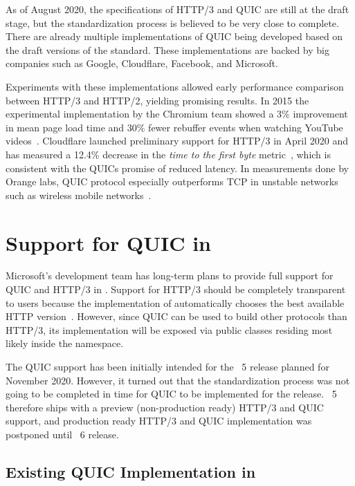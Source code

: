 As of August 2020, the specifications of HTTP/3 and QUIC are still at the draft stage, but the
standardization process is believed to be very close to complete. There are already multiple
implementations of QUIC being developed based on the draft versions of the standard. These
implementations are backed by big companies such as Google, Cloudflare, Facebook, and Microsoft.

Experiments with these implementations allowed early performance comparison between HTTP/3 and
HTTP/2, yielding promising results. In 2015 the experimental implementation by the Chromium team showed a
3\% improvement in mean page load time and 30\% fewer rebuffer events when watching YouTube
videos~\cite{Wilk2015}. Cloudflare launched preliminary support for HTTP/3 in April 2020 and has
measured a 12.4\% decrease in the \textit{time to the first byte} metric~\cite{Tellakula2020}, which
is consistent with the QUICs promise of reduced latency. In measurements done by Orange labs, QUIC
protocol especially outperforms TCP in unstable networks such as wireless mobile
networks~\cite{Cook2017}.

\section{Support for QUIC in \dotnet{}}

Microsoft's \dotnet{} development team has long-term plans to provide full support for QUIC and
HTTP/3 in \dotnet{}. Support for HTTP/3 should be completely transparent to users because the
implementation of  automatically chooses the best available HTTP
version~\cite{HttpClientDocs}. However, since QUIC can be used to build other protocols than HTTP/3,
its implementation will be exposed via public classes residing most likely inside the
 namespace.

The QUIC support has been initially intended for the \dotnet{}~5 release planned for November 2020.
However, it turned out that the standardization process was not going to be completed in time for
QUIC to be implemented for the release. \dotnet{}~5 therefore ships with a preview (non-production
ready) HTTP/3 and QUIC support, and production ready HTTP/3 and QUIC implementation was postponed
until \dotnet{}~6 release.

\subsection*{Existing QUIC Implementation in \dotnet{}}

